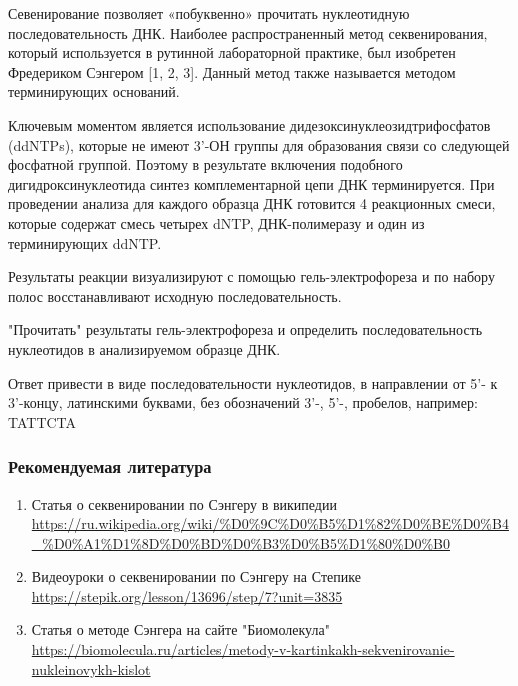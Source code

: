 
Севенирование позволяет «побуквенно» прочитать нуклеотидную  последовательность ДНК. Наиболее распространенный метод секвенирования, который используется в рутинной лабораторной практике, был изобретен Фредериком Сэнгером [1, 2, 3﻿]. Данный метод также называется методом терминирующих оснований.

Ключевым моментом является использование дидезоксинуклеозидтрифосфатов (ddNTPs), которые не имеют 3’-ОН группы для образования связи со следующей фосфатной группой. Поэтому в результате включения подобного дигидроксинуклеотида синтез комплементарной цепи ДНК терминируется. При проведении анализа для каждого образца ДНК готовится 4 реакционных смеси, которые содержат смесь четырех dNTP, ДНК-полимеразу и один из терминирующих ddNTP.

Результаты реакции визуализируют с помощью гель-электрофореза и по набору полос восстанавливают исходную последовательность. 

"Прочитать" результаты гель-электрофореза и определить последовательность нуклеотидов в анализируемом образце ДНК.


Ответ привести в виде последовательности нуклеотидов, в направлении от 5'- к 3'-концу, латинскими буквами, без обозначений 3'-, 5'-, пробелов, например: TATTCTA

\subsubsection*{Рекомендуемая литература}

\begin{enumerate}
    \item Статья о секвенировании по Сэнгеру в википедии \url{https://ru.wikipedia.org/wiki/%D0%9C%D0%B5%D1%82%D0%BE%D0%B4_%D0%A1%D1%8D%D0%BD%D0%B3%D0%B5%D1%80%D0%B0}
    \item Видеоуроки о секвенировании по Сэнгеру на Степике \url{https://stepik.org/lesson/13696/step/7?unit=3835}
    \item Статья о методе Сэнгера ﻿на сайте "Биомолекула" \url{ https://biomolecula.ru/articles/metody-v-kartinkakh-sekvenirovanie-nukleinovykh-kislot}
\end{enumerate}